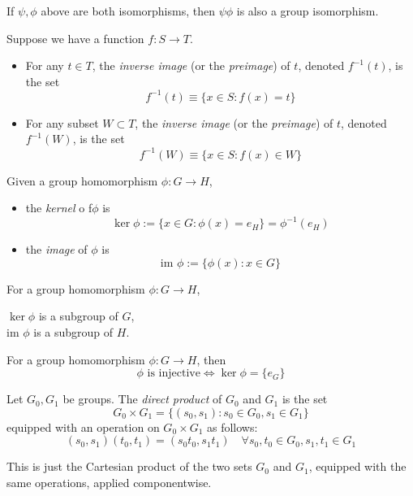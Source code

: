 \documentclass[a5paper]{article}
\newcommand{\im}{\text{im }}
\begin{document}
\begin{corollary}
If $\psi, \phi$ above are both isomorphisms, then $\psi \phi$ is also a group isomorphism. 
\end{corollary}

\begin{definition*} Suppose we have a function $f:S \to T$.\\
\begin{itemize}
\item For any $t \in T$, the \emph{inverse image} (or the \emph{preimage}) of $t$, denoted $f^{-1}(t)$, is the set 
$$f^{-1}(t) \equiv	\{x \in S: f(x) = t\}$$
\item For any subset $W \subset T$, the \emph{inverse image} (or the \emph{preimage}) of $t$, denoted $f^{-1}(W)$, is the set 
$$f^{-1}(W) \equiv	\{x \in S: f(x) \in W\}$$
\end{itemize}
\end{definition*}

\begin{definition*}
Given a group homomorphism $\phi:G \to H$, 
\begin{itemize}
\item the \emph{kernel} o f$\phi$ is 
$$\ker{\phi} := \{x \in G: \phi(x) = e_H\} = \phi^{-1}(e_H)$$
\item the \emph{image} of $\phi$ is 
$$\im{\phi} := \{\phi(x):x \in G\}$$
\end{itemize}
\end{definition*}

\begin{proposition*}
For a group homomorphism $\phi:G \to H$,
\begin{center}
$\ker{\phi}$ is a subgroup of $G$, \\
$\im{\phi}$ is a subgroup of $H$.
\end{center}
\end{proposition*}

\begin{lemma}
For a group homomorphism $\phi:G \to H$, then 
$$\phi \text{ is injective} \iff \ker{\phi} = \{e_G\}$$
\end{lemma}

\begin{definition*}
Let $G_0, G_1$ be groups. The \emph{direct product} of $G_0$ and $G_1$ is the set 
$$G_0\times G_1 = \{(s_0,s_1):s_0 \in G_0, s_1 \in G_1\}$$
equipped with an operation on $G_0\times G_1$ as follows:
$$(s_0,s_1)(t_0,t_1) = (s_0t_0,s_1t_1) \quad \forall s_0,t_0\in G_0, s_1,t_1 \in G_1$$

This is just the Cartesian product of the two sets $G_0$ and $G_1$, equipped with the same operations, applied componentwise.
\end{definition*}
\end{document}
